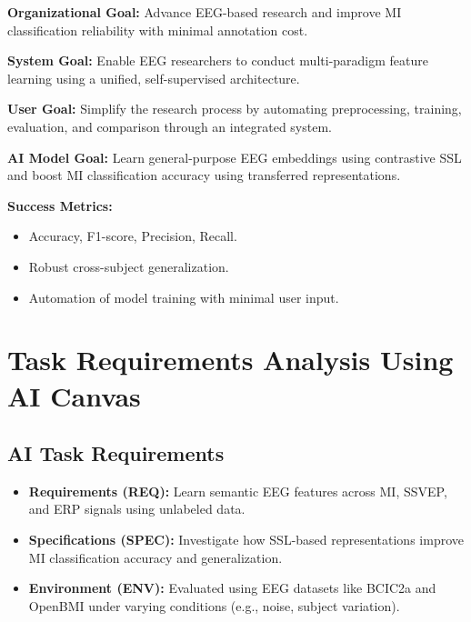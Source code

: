 \noindent\textbf{Organizational Goal:} Advance EEG-based research and improve MI classification reliability with minimal annotation cost.

\vspace{0.5em}
\noindent\textbf{System Goal:} Enable EEG researchers to conduct multi-paradigm feature learning using a unified, self-supervised architecture.

\vspace{0.5em}
\noindent\textbf{User Goal:} Simplify the research process by automating preprocessing, training, evaluation, and comparison through an integrated system.

\vspace{0.5em}
\noindent\textbf{AI Model Goal:} Learn general-purpose EEG embeddings using contrastive SSL and boost MI classification accuracy using transferred representations.

\vspace{1em}
\noindent\textbf{Success Metrics:}
\begin{itemize}
    \item Accuracy, F1-score, Precision, Recall.
    \item Robust cross-subject generalization.
    \item Automation of model training with minimal user input.
\end{itemize}

\section{Task Requirements Analysis Using AI Canvas}
\label{sec:ai-canvas}

\subsection{AI Task Requirements}
\label{subsec:ai-task-requirements}
\begin{itemize}[leftmargin=3.5em]
    \item \textbf{Requirements (REQ):} Learn semantic EEG features across MI, SSVEP, and ERP signals using unlabeled data.
    \item \textbf{Specifications (SPEC):} Investigate how SSL-based representations improve MI classification accuracy and generalization.
    \item \textbf{Environment (ENV):} Evaluated using EEG datasets like BCIC2a and OpenBMI under varying conditions (e.g., noise, subject variation).
\end{itemize}

